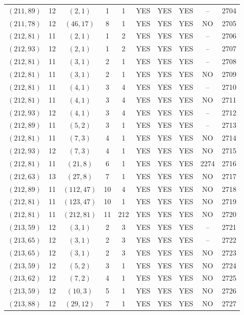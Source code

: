 \begin{longtable}{|c|c|c|c|c|c|c|c|c|c|}
$(211, 89)$ & 12 & $(2, 1)$ & 1 & 1 & YES & YES & YES & -- & 2704\\
$(211, 78)$ & 12 & $(46, 17)$ & 8 & 1 & YES & YES & YES & NO & 2705\\
$(212, 81)$ & 11 & $(2, 1)$ & 1 & 2 & YES & YES & YES & -- & 2706\\
$(212, 93)$ & 12 & $(2, 1)$ & 1 & 2 & YES & YES & YES & -- & 2707\\
$(212, 81)$ & 11 & $(3, 1)$ & 2 & 1 & YES & YES & YES & -- & 2708\\
$(212, 81)$ & 11 & $(3, 1)$ & 2 & 1 & YES & YES & YES & NO & 2709\\
$(212, 81)$ & 11 & $(4, 1)$ & 3 & 4 & YES & YES & YES & -- & 2710\\
$(212, 81)$ & 11 & $(4, 1)$ & 3 & 4 & YES & YES & YES & NO & 2711\\
$(212, 93)$ & 12 & $(4, 1)$ & 3 & 4 & YES & YES & YES & -- & 2712\\
$(212, 89)$ & 11 & $(5, 2)$ & 3 & 1 & YES & YES & YES & -- & 2713\\
$(212, 81)$ & 11 & $(7, 3)$ & 4 & 1 & YES & YES & YES & NO & 2714\\
$(212, 93)$ & 12 & $(7, 3)$ & 4 & 1 & YES & YES & YES & NO & 2715\\
$(212, 81)$ & 11 & $(21, 8)$ & 6 & 1 & YES & YES & YES & 2274 & 2716\\
$(212, 63)$ & 13 & $(27, 8)$ & 7 & 1 & YES & YES & YES & NO & 2717\\
$(212, 89)$ & 11 & $(112, 47)$ & 10 & 4 & YES & YES & YES & NO & 2718\\
$(212, 81)$ & 11 & $(123, 47)$ & 10 & 1 & YES & YES & YES & NO & 2719\\
$(212, 81)$ & 11 & $(212, 81)$ & 11 & 212 & YES & YES & YES & NO & 2720\\
$(213, 59)$ & 12 & $(3, 1)$ & 2 & 3 & YES & YES & YES & -- & 2721\\
$(213, 65)$ & 12 & $(3, 1)$ & 2 & 3 & YES & YES & YES & -- & 2722\\
$(213, 65)$ & 12 & $(3, 1)$ & 2 & 3 & YES & YES & YES & NO & 2723\\
$(213, 59)$ & 12 & $(5, 2)$ & 3 & 1 & YES & YES & YES & NO & 2724\\
$(213, 62)$ & 12 & $(7, 2)$ & 4 & 1 & YES & YES & YES & NO & 2725\\
$(213, 59)$ & 12 & $(10, 3)$ & 5 & 1 & YES & YES & YES & NO & 2726\\
$(213, 88)$ & 12 & $(29, 12)$ & 7 & 1 & YES & YES & YES & NO & 2727\\

\end{longtable}
